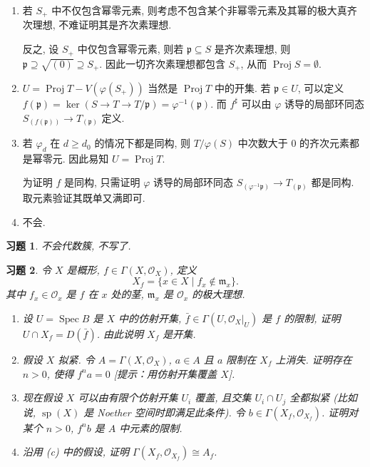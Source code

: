 \documentclass{article}
\theoremstyle{exercise}
\newtheorem{exercise}{习题}[section]
\newenvironment{proofc}{\proof}{\endproof}
\def\gp{\mathfrak{p}}
\def\gm{\mathfrak{m}}
\def\cO{\mathscr{O}}
\def\spp{\operatorname{sp}}
\def\Spec{\operatorname{Spec}}
\def\Proj{\operatorname{Proj}}
\def\geq{\geqslant}
\begin{document}
\begin{proofc}
  \begin{enumerate}[label={(\alph*)}]
    \item 若 $S_+$ 中不仅包含幂零元素,
          则考虑不包含某个非幂零元素及其幂的极大真齐次理想,
          不难证明其是齐次素理想.

          反之, 设 $S_+$ 中仅包含幂零元素, 则若 $\gp \subseteq S$ 是齐次素理想,
          则 $\gp \supseteq \sqrt{(0)} \supseteq S_+$.
          因此一切齐次素理想都包含 $S_+$, 从而 $\Proj S = \emptyset$.
    \item $U = \Proj T - V(\varphi(S_+))$ 当然是 $\Proj T$ 中的开集.
          若 $\gp \in U$, 可以定义 $f(\gp) = \ker (S \to T \to T / \gp) = \varphi^{-1}(\gp)$.
          而 $f^\sharp$ 可以由 $\varphi$ 诱导的局部环同态 $S_{(f(\gp))} \to T_{(\gp)}$ 定义.
    \item 若 $\varphi_d$ 在 $d \geq d_0$ 的情况下都是同构,
          则 $T / \varphi(S)$ 中次数大于 $0$ 的齐次元素都是幂零元.
          因此易知 $U = \Proj T$.

          为证明 $f$ 是同构, 只需证明 $\varphi$ 诱导的局部环同态
          $S_{(\varphi^{-1}\gp)} \to T_{(\gp)}$ 都是同构. 取元素验证其既单又满即可.
    \item 不会.
          \qedhere
  \end{enumerate}
\end{proofc}

\begin{exercise}
  不会代数簇, 不写了.
\end{exercise}

\begin{exercise}
  令 $X$ 是概形, $f \in \Gamma(X, \cO_X)$, 定义
  \[
    X_f = \{ x \in X \mid f_x \notin \gm_x \}.
  \]
  其中 $f_x \in \cO_x$ 是 $f$ 在 $x$ 处的茎, $\gm_x$ 是 $\cO_x$ 的极大理想.
  \begin{enumerate}[label={(\alph*)}]
    \item 设 $U = \Spec B$ 是 $X$ 中的仿射开集, $\bar{f} \in \Gamma(U, \cO_X|_U)$ 是 $f$ 的限制,
          证明 $U \cap X_f = D(\bar{f})$. 由此说明 $X_f$ 是开集.
    \item 假设 $X$ 拟紧. 令 $A = \Gamma(X, \cO_X)$, $a \in A$ 且 $a$ 限制在 $X_f$ 上消失.
          证明存在 $n > 0$, 使得 $f^n a = 0$ [提示：用仿射开集覆盖 $X$].
    \item 现在假设 $X$ 可以由有限个仿射开集 $U_i$ 覆盖, 且交集 $U_i \cap U_j$ 全都拟紧
          (比如说, $\spp(X)$ 是 Noether 空间时即满足此条件).
          令 $b \in \Gamma(X_f, \cO_{X_f})$. 证明对某个 $n > 0$, $f^n b$ 是 $A$ 中元素的限制.
    \item 沿用 (c) 中的假设, 证明 $\Gamma(X_f, \cO_{X_f}) \cong A_f$.
  \end{enumerate}
\end{exercise}
\end{document}
